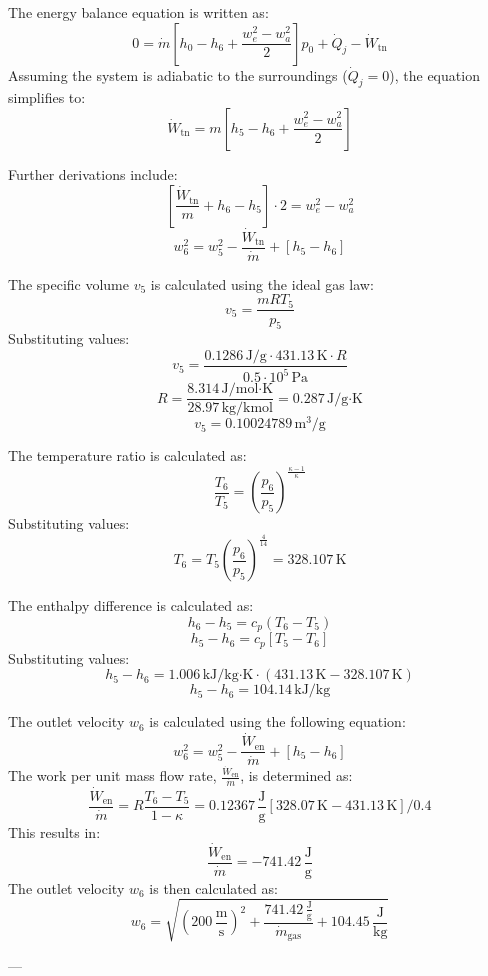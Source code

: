 The energy balance equation is written as:  
\[
0 = \dot{m} \left[ h_0 - h_6 + \frac{w_e^2 - w_a^2}{2} \right] p_0 + \dot{Q}_j - \dot{W}_{\text{tn}}
\]  
Assuming the system is adiabatic to the surroundings (\( \dot{Q}_j = 0 \)), the equation simplifies to:  
\[
\dot{W}_{\text{tn}} = m \left[ h_5 - h_6 + \frac{w_e^2 - w_a^2}{2} \right]
\]  

Further derivations include:  
\[
\left[ \frac{\dot{W}_{\text{tn}}}{m} + h_6 - h_5 \right] \cdot 2 = w_e^2 - w_a^2
\]  
\[
w_6^2 = w_5^2 - \frac{\dot{W}_{\text{tn}}}{\dot{m}} + \left[ h_5 - h_6 \right]
\]  

The specific volume \( v_5 \) is calculated using the ideal gas law:  
\[
v_5 = \frac{mRT_5}{p_5}
\]  
Substituting values:  
\[
v_5 = \frac{0.1286 \, \text{J/g} \cdot 431.13 \, \text{K} \cdot R}{0.5 \cdot 10^5 \, \text{Pa}}
\]  
\[
R = \frac{8.314 \, \text{J/mol·K}}{28.97 \, \text{kg/kmol}} = 0.287 \, \text{J/g·K}
\]  
\[
v_5 = 0.10024789 \, \text{m}^3/\text{g}
\]  

The temperature ratio is calculated as:  
\[
\frac{T_6}{T_5} = \left( \frac{p_6}{p_5} \right)^{\frac{\kappa - 1}{\kappa}}
\]  
Substituting values:  
\[
T_6 = T_5 \left( \frac{p_6}{p_5} \right)^{\frac{4}{14}} = 328.107 \, \text{K}
\]  

The enthalpy difference is calculated as:  
\[
h_6 - h_5 = c_p \left( T_6 - T_5 \right)
\]  
\[
h_5 - h_6 = c_p \left[ T_5 - T_6 \right]
\]  
Substituting values:  
\[
h_5 - h_6 = 1.006 \, \text{kJ/kg·K} \cdot \left( 431.13 \, \text{K} - 328.107 \, \text{K} \right)
\]  
\[
h_5 - h_6 = 104.14 \, \text{kJ/kg}
\]

The outlet velocity \( w_6 \) is calculated using the following equation:  
\[
w_6^2 = w_5^2 - \frac{\dot{W}_{\text{en}}}{\dot{m}} + \left[h_5 - h_6\right]
\]  
The work per unit mass flow rate, \( \frac{\dot{W}_{\text{en}}}{\dot{m}} \), is determined as:  
\[
\frac{\dot{W}_{\text{en}}}{\dot{m}} = R \frac{T_6 - T_5}{1 - \kappa} = 0.12367 \, \frac{\text{J}}{\text{g}} \left[328.07 \, \text{K} - 431.13 \, \text{K}\right] / 0.4
\]  
This results in:  
\[
\frac{\dot{W}_{\text{en}}}{\dot{m}} = -741.42 \, \frac{\text{J}}{\text{g}}
\]  
The outlet velocity \( w_6 \) is then calculated as:  
\[
w_6 = \sqrt{\left(200 \, \frac{\text{m}}{\text{s}}\right)^2 + \frac{741.42 \, \frac{\text{J}}{\text{g}}}{\dot{m}_{\text{gas}}} + 104.45 \, \frac{\text{J}}{\text{kg}}}
\]  

---